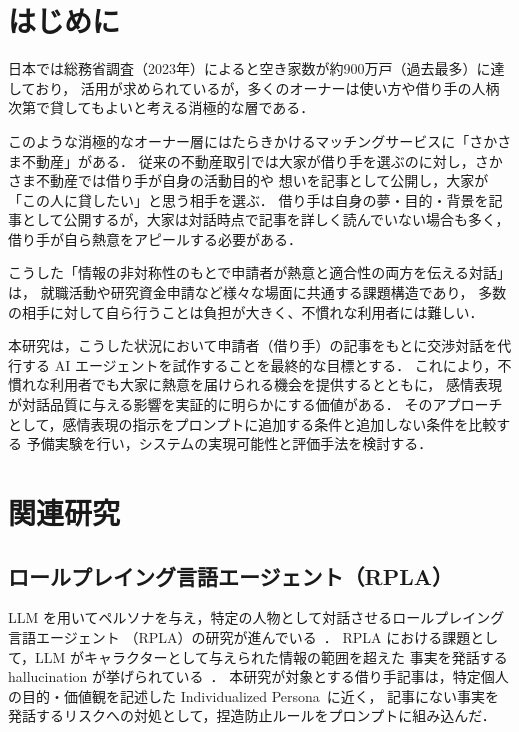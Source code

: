 \documentclass[dvipdfmx]{FITpaper}
\begin{document}
\maketitle

\section{はじめに}

日本では総務省調査（2023年）によると空き家数が約900万戸（過去最多）に達しており，
活用が求められているが，多くのオーナーは使い方や借り手の人柄次第で貸してもよいと考える消極的な層である．

このような消極的なオーナー層にはたらきかけるマッチングサービスに「さかさま不動産」がある．
従来の不動産取引では大家が借り手を選ぶのに対し，さかさま不動産では借り手が自身の活動目的や
想いを記事として公開し，大家が「この人に貸したい」と思う相手を選ぶ．
借り手は自身の夢・目的・背景を記事として公開するが，大家は対話時点で記事を詳しく読んでいない場合も多く，借り手が自ら熱意をアピールする必要がある．

こうした「情報の非対称性のもとで申請者が熱意と適合性の両方を伝える対話」は，
就職活動や研究資金申請など様々な場面に共通する課題構造であり，
多数の相手に対して自ら行うことは負担が大きく、不慣れな利用者には難しい．

本研究は，こうした状況において申請者（借り手）の記事をもとに交渉対話を代行する
AI エージェントを試作することを最終的な目標とする．
これにより，不慣れな利用者でも大家に熱意を届けられる機会を提供するとともに，
感情表現が対話品質に与える影響を実証的に明らかにする価値がある．
そのアプローチとして，感情表現の指示をプロンプトに追加する条件と追加しない条件を比較する
予備実験を行い，システムの実現可能性と評価手法を検討する．
\\

\section{関連研究}

\subsection{ロールプレイング言語エージェント（RPLA）}

LLM を用いてペルソナを与え，特定の人物として対話させるロールプレイング言語エージェント
（RPLA）の研究が進んでいる~\cite{chen2024rpla,tseng2024twotales}．
RPLA における課題として，LLM がキャラクターとして与えられた情報の範囲を超えた
事実を発話する hallucination が挙げられている~\cite{yu2024timechara}．
本研究が対象とする借り手記事は，特定個人の目的・価値観を記述した
Individualized Persona~\cite{chen2024rpla}に近く，
記事にない事実を発話するリスクへの対処として，捏造防止ルールをプロンプトに組み込んだ．
\end{document}
